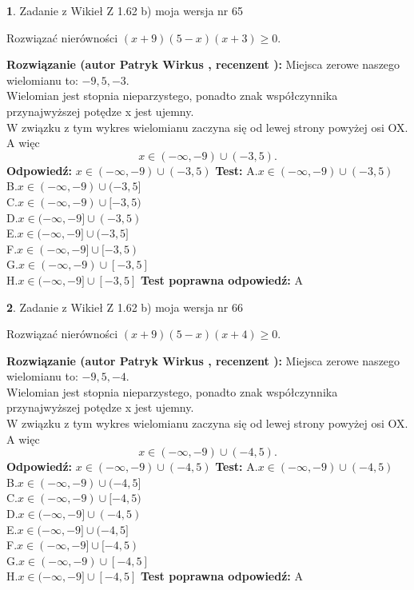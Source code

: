 \documentclass[12pt, a4paper]{article}
\theoremstyle{definition} %
\newtheorem{zad}{}
\newcommand{\zadStart}[1]{\begin{zad}#1\newline}
\newcommand{\zadStop}{\end{zad}}
\newcommand{\rozwStart}[2]{\noindent \textbf{Rozwiązanie (autor #1 , recenzent #2): }\newline}
\newcommand{\rozwStop}{\newline}
\newcommand{\odpStart}{\noindent \textbf{Odpowiedź:}\newline}
\newcommand{\odpStop}{\newline}
\newcommand{\testStart}{\noindent \textbf{Test:}\newline}
\newcommand{\testStop}{\newline}
\newcommand{\kluczStart}{\noindent \textbf{Test poprawna odpowiedź:}\newline}
\newcommand{\kluczStop}{\newline}
\begin{document}
\zadStart{Zadanie z Wikieł Z 1.62 b) moja wersja nr 65}

Rozwiązać nierówności $(x+9)(5-x)(x+3)\ge0$.
\zadStop
\rozwStart{Patryk Wirkus}{}
Miejsca zerowe naszego wielomianu to: $-9, 5, -3$.\\
Wielomian jest stopnia nieparzystego, ponadto znak współczynnika przy\linebreak najwyższej potędze x jest ujemny.\\ W związku z tym wykres wielomianu zaczyna się od lewej strony powyżej osi OX. A więc $$x \in (-\infty,-9) \cup (-3,5).$$
\rozwStop
\odpStart
$x \in (-\infty,-9) \cup (-3,5)$
\odpStop
\testStart
A.$x \in (-\infty,-9) \cup (-3,5)$\\
B.$x \in (-\infty,-9) \cup (-3,5]$\\
C.$x \in (-\infty,-9) \cup [-3,5)$\\
D.$x \in (-\infty,-9] \cup (-3,5)$\\
E.$x \in (-\infty,-9] \cup (-3,5]$\\
F.$x \in (-\infty,-9] \cup [-3,5)$\\
G.$x \in (-\infty,-9) \cup [-3,5]$\\
H.$x \in (-\infty,-9] \cup [-3,5]$
\testStop
\kluczStart
A
\kluczStop



\zadStart{Zadanie z Wikieł Z 1.62 b) moja wersja nr 66}

Rozwiązać nierówności $(x+9)(5-x)(x+4)\ge0$.
\zadStop
\rozwStart{Patryk Wirkus}{}
Miejsca zerowe naszego wielomianu to: $-9, 5, -4$.\\
Wielomian jest stopnia nieparzystego, ponadto znak współczynnika przy\linebreak najwyższej potędze x jest ujemny.\\ W związku z tym wykres wielomianu zaczyna się od lewej strony powyżej osi OX. A więc $$x \in (-\infty,-9) \cup (-4,5).$$
\rozwStop
\odpStart
$x \in (-\infty,-9) \cup (-4,5)$
\odpStop
\testStart
A.$x \in (-\infty,-9) \cup (-4,5)$\\
B.$x \in (-\infty,-9) \cup (-4,5]$\\
C.$x \in (-\infty,-9) \cup [-4,5)$\\
D.$x \in (-\infty,-9] \cup (-4,5)$\\
E.$x \in (-\infty,-9] \cup (-4,5]$\\
F.$x \in (-\infty,-9] \cup [-4,5)$\\
G.$x \in (-\infty,-9) \cup [-4,5]$\\
H.$x \in (-\infty,-9] \cup [-4,5]$
\testStop
\kluczStart
A
\kluczStop
\end{document}
